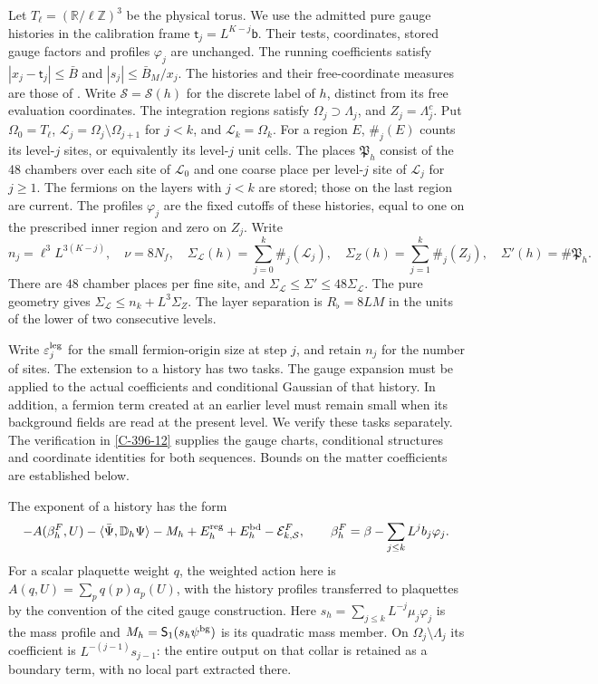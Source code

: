 \documentclass[11pt,letterpaper,reqno]{amsart}
\theoremstyle{definition}
\theoremstyle{remark}
\begin{document}
Let $T_\ell=(\mathbb R/\ell\mathbb Z)^3$ be the physical torus.
We use the admitted pure gauge histories in the calibration frame
$\mathsf t_j=L^{K-j}\mathsf b$. Their tests, coordinates, stored
gauge factors and profiles $\varphi_j$ are unchanged. The running
coefficients satisfy $|x_j-\mathsf t_j|\le\bar B$ and
$|s_j|\le\bar B_M/x_j$.
The histories and their free-coordinate measures are those of
\cite[Section~44 and Theorem~D]{YMM1}. Write $\mathcal S=\mathcal S(h)$
for the discrete label of $h$, distinct from its free evaluation
coordinates. The integration regions
satisfy $\Omega_j\supset\Lambda_j$, and $Z_j=\Lambda_j^c$.
Put $\Omega_0=T_\ell$,
$\mathcal L_j=\Omega_j\setminus\Omega_{j+1}$ for $j<k$,
and $\mathcal L_k=\Omega_k$.
For a region $E$, $\#_j(E)$ counts its level-$j$ sites, or
equivalently its level-$j$ unit cells. The places $\mathfrak P_h$
consist of the 48 chambers over each site of $\mathcal L_0$
and one coarse place per level-$j$ site of $\mathcal L_j$ for $j\ge1$.
The fermions on the layers with $j<k$ are stored; those on the
last region are current. The profiles $\varphi_j$ are the fixed
cutoffs of these histories, equal to one on the prescribed inner
region and zero on $Z_j$. Write
\[
 n_j=\ell^3L^{3(K-j)},\quad \nu=8N_f,\quad
 \Sigma_{\mathcal L}(h)=\sum_{j=0}^k\#_j(\mathcal L_j),\quad
 \Sigma_Z(h)=\sum_{j=1}^k\#_j(Z_j),\quad
 \Sigma'(h)=\#\mathfrak P_h.
\]
There are $48$ chamber places per fine site, and
$\Sigma_{\mathcal L}\le\Sigma'\le48\Sigma_{\mathcal L}$.
The pure geometry gives
$\Sigma_{\mathcal L}\le n_k+L^3\Sigma_Z$.
The layer separation is $R_\flat=8LM$ in the units of the lower
of two consecutive levels.

Write $\varepsilon_j^{\rm leg}$ for the small fermion-origin
size at step $j$, and retain $n_j$ for the number of sites.
The extension to a history has two tasks. The gauge expansion
must be applied to the actual coefficients and conditional
Gaussian of that history. In addition, a fermion term created
at an earlier level must remain small when its background
fields are read at the present level. We verify these tasks
separately. The verification in \cref{C-396-12} supplies the
gauge charts, conditional structures and coordinate identities
for both sequences. Bounds on the matter coefficients are
established below.

The exponent of a history has the form
\begin{equation}\label{eq:qcd-history-format}
 -A(\beta_h^F,U)-\langle\bar\Psi,\mathbb D_h\Psi\rangle
 -M_h+E_h^{\rm reg}+E_h^{\rm bd}-\mathcal E^F_{k,\mathcal S},
 \qquad
 \beta_h^F=\beta-\sum_{j\le k}L^jb_j\varphi_j.
\end{equation}
For a scalar plaquette weight $q$, the weighted action here is
$A(q,U)=\sum_pq(p)a_p(U)$, with the history profiles transferred
to plaquettes by the convention of the cited gauge construction.
Here $s_h=\sum_{j\le k}L^{-j}\mu_j\varphi_j$ is the mass
profile and $M_h=\mathsf S_1(s_h\psi^{\rm bg})$ is its
quadratic mass member. On $\Omega_j\setminus\Lambda_j$ its coefficient is
$L^{-(j-1)}s_{j-1}$: the entire output on that collar is retained
as a boundary term, with no local part extracted there.
\end{document}
